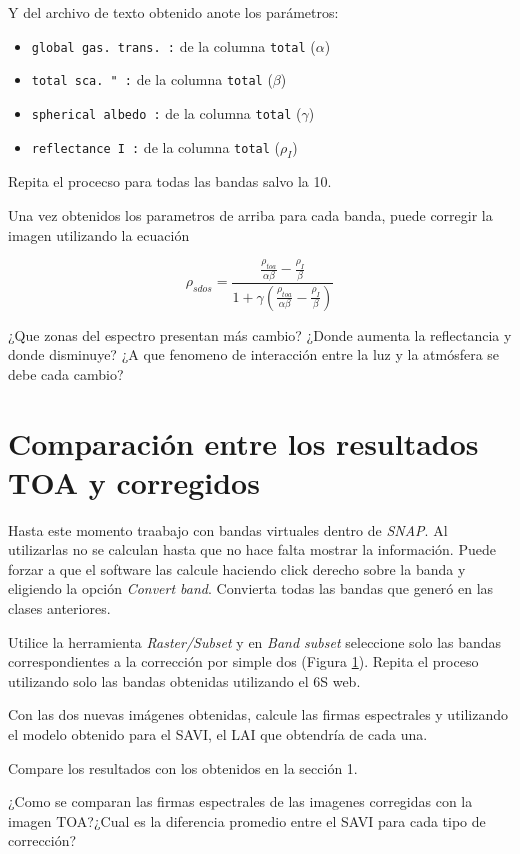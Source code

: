 Y del archivo de texto obtenido anote los parámetros:

\begin{itemize}
    \item \texttt{global gas. trans. :} de la columna \texttt{total} ($\alpha$)
    \item \texttt{total  sca.   "    :} de la columna \texttt{total} ($\beta$)
    \item \texttt{spherical albedo   :} de la columna \texttt{total} ($\gamma$)
    \item \texttt{reflectance I      :} de la columna \texttt{total} ($\rho_I$)
\end{itemize}

Repita el procecso para todas las bandas salvo la 10.

Una vez obtenidos los parametros de arriba para cada banda, puede corregir la imagen utilizando la ecuación

\begin{equation}
    \rho_{sdos} = \frac{\frac{\rho_{toa}}{\alpha \beta} - \frac{\rho_I}{\beta}}{1+\gamma \left(\frac{\rho_{toa}}{\alpha \beta} - \frac{\rho_I}{\beta}\right)}
\end{equation}

\begin{que}
    ¿Que zonas del espectro presentan más cambio? ¿Donde aumenta la reflectancia y donde disminuye? ¿A que fenomeno de interacción entre la luz y la atmósfera se debe cada cambio?
\end{que}

\section{Comparación entre los resultados TOA y corregidos}

Hasta este momento traabajo con bandas virtuales dentro de \emph{SNAP}. Al utilizarlas no se calculan hasta que no hace falta mostrar la información. Puede forzar a que el software las calcule haciendo click derecho sobre la banda y eligiendo la opción \emph{Convert band}. Convierta todas las bandas que generó en las clases anteriores.

Utilice la herramienta \emph{Raster/Subset} y en \emph{Band subset} seleccione solo las bandas correspondientes a la corrección por simple dos (Figura \ref{fig:subset}). Repita el proceso utilizando solo las bandas obtenidas utilizando el 6S web.

\begin{figure}[h!]
    \centering
    \caption{}
    \label{fig:subset}
\end{figure}

Con las dos nuevas imágenes obtenidas, calcule las firmas espectrales y utilizando el modelo obtenido para el SAVI, el LAI que obtendría de cada una.

Compare los resultados con los obtenidos en la sección 1.

\begin{que}
    ¿Como se comparan las firmas espectrales de las imagenes corregidas con la imagen TOA?¿Cual es la diferencia promedio entre el SAVI para cada tipo de corrección?
\end{que}
